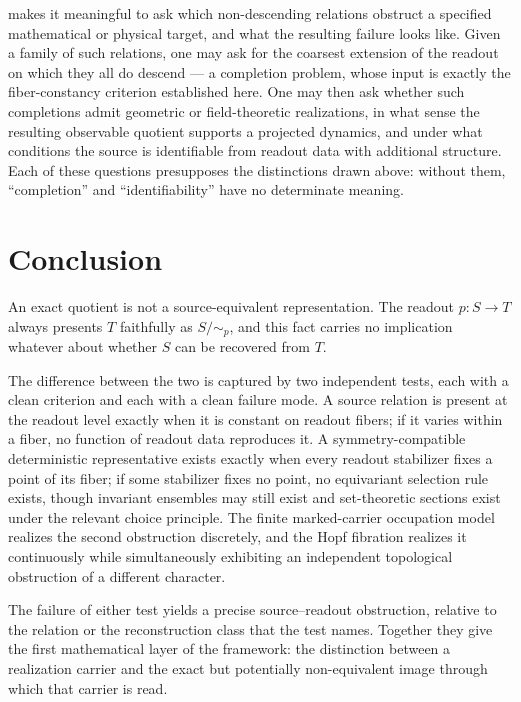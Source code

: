 \documentclass[11pt,reqno]{amsart}
\theoremstyle{plain}
\theoremstyle{definition}
\theoremstyle{remark}
\begin{document}
 makes it meaningful to ask which non-descending relations obstruct a specified mathematical or physical target, and what the resulting failure looks like. Given a family of such relations, one may ask for the coarsest extension of the readout on which they all do descend --- a completion problem, whose input is exactly the fiber-constancy criterion established here. One may then ask whether such completions admit geometric or field-theoretic realizations, in what sense the resulting observable quotient supports a projected dynamics, and under what conditions the source is identifiable from readout data with additional structure. Each of these questions presupposes the distinctions drawn above: without them, ``completion'' and ``identifiability'' have no determinate meaning.

\section{Conclusion}
\label{sec:conclusion}

An exact quotient is not a source-equivalent representation. The readout $p\colon S\to T$ always presents $T$ faithfully as $S/\!\sim_{p}$, and this fact carries no implication whatever about whether $S$ can be recovered from $T$.

The difference between the two is captured by two independent tests, each with a clean criterion and each with a clean failure mode. A source relation is present at the readout level exactly when it is constant on readout fibers; if it varies within a fiber, no function of readout data reproduces it. A symmetry-compatible deterministic representative exists exactly when every readout stabilizer fixes a point of its fiber; if some stabilizer fixes no point, no equivariant selection rule exists, though invariant ensembles may still exist and set-theoretic sections exist under the relevant choice principle. The finite marked-carrier occupation model realizes the second obstruction discretely, and the Hopf fibration realizes it continuously while simultaneously exhibiting an independent topological obstruction of a different character.

The failure of either test yields a precise source--readout obstruction, relative to the relation or the reconstruction class that the test names. Together they give the first mathematical layer of the framework: the distinction between a realization carrier and the exact but potentially non-equivalent image through which that carrier is read.
\end{document}
